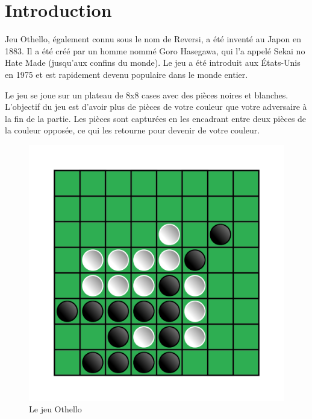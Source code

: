 \documentclass[12pt]{article}
\begin{document}
 
	\thispagestyle{empty}
	
	
	
	\newpage
	\tableofcontents
	\newpage
	\listoffigures
	\newpage
	\printglossary[title={Liste des Abbréviations}] %
	\newpage
	\section{Introduction}

Jeu Othello, également connu sous le nom de Reversi, a été inventé au Japon en 1883. Il a été créé par un homme nommé Goro Hasegawa, qui l'a appelé Sekai no Hate Made (jusqu'aux confins du monde). Le jeu a été introduit aux États-Unis en 1975 et est rapidement devenu populaire dans le monde entier.

Le jeu se joue sur un plateau de 8x8 cases avec des pièces noires et blanches. L'objectif du jeu est d'avoir plus de pièces de votre couleur que votre adversaire à la fin de la partie. Les pièces sont capturées en les encadrant entre deux pièces de la couleur opposée, ce qui les retourne pour devenir de votre couleur.
\begin{figure}[H]
	\centering
	\includegraphics[scale=0.4]{img/othello}
	\caption{Le jeu Othello}
	\label{othello figure}
\end{figure}
\newpage
\end{document}
